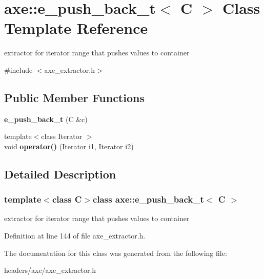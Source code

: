 \hypertarget{classaxe_1_1e__push__back__t}{\section{axe\+:\+:e\+\_\+push\+\_\+back\+\_\+t$<$ C $>$ Class Template Reference}
\label{classaxe_1_1e__push__back__t}
}


extractor for iterator range that pushes values to container  




{\ttfamily \#include $<$axe\+\_\+extractor.\+h$>$}

\subsection*{Public Member Functions}
\begin{DoxyCompactItemize}
\item 
\hypertarget{classaxe_1_1e__push__back__t_aee5788b90e1243a7e8b676ad7694a183}{{\bfseries e\+\_\+push\+\_\+back\+\_\+t} (C \&c)}\label{classaxe_1_1e__push__back__t_aee5788b90e1243a7e8b676ad7694a183}

\item 
\hypertarget{classaxe_1_1e__push__back__t_a5d8e6494b679a07b92c2b6d1e31023c9}{{\footnotesize template$<$class Iterator $>$ }\\void {\bfseries operator()} (Iterator i1, Iterator i2)}\label{classaxe_1_1e__push__back__t_a5d8e6494b679a07b92c2b6d1e31023c9}

\end{DoxyCompactItemize}


\subsection{Detailed Description}
\subsubsection*{template$<$class C$>$class axe\+::e\+\_\+push\+\_\+back\+\_\+t$<$ C $>$}

extractor for iterator range that pushes values to container 

Definition at line 144 of file axe\+\_\+extractor.\+h.



The documentation for this class was generated from the following file\+:\begin{DoxyCompactItemize}
\item 
headers/axe/axe\+\_\+extractor.\+h\end{DoxyCompactItemize}
